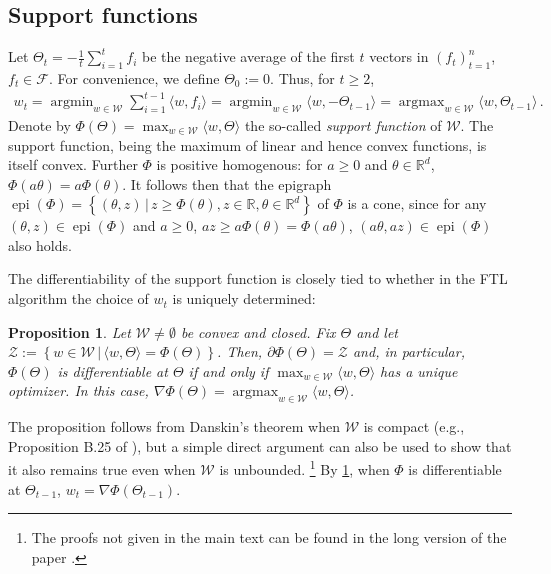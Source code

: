 \documentclass[english]{article}
\newcommand{\todoa}[2][]{\todo[color=Purple!20,size=\tiny,#1]{A: #2}}
\newcommand{\todor}[2][]{\todo[color=Blue!10,size=\tiny,#1]{R: #2}}
\newcommand{\cZ}{\mathcal{Z}}
\newcommand{\cW}{\mathcal{W}}
\newcommand{\cF}{\mathcal{F}}
\newcommand{\R}{\mathbb{R}}
\newcommand{\inpro}[2]{\langle #1, #2\rangle}
\newcommand{\ip}[1]{\langle#1\rangle}
\newcommand{\set}[2]{\left\{#1 \,\vert\, #2 \right\}}
\DeclareMathOperator*{\argmin}{argmin}
\DeclareMathOperator*{\argmax}{argmax}
\DeclareMathOperator{\epi}{epi}
\newtheorem{prop}[thm]{Proposition}
\begin{document}
\subsection{Support functions}
Let $\Theta_t = -\frac1t \sum_{i=1}^t f_i$ be the negative average of the first $t$ vectors
in $(f_t)_{t=1}^n$, $f_t\in \cF$.
For convenience, we define $\Theta_0 := 0$.
Thus, for $t\ge 2$,
\begin{align*}
w_t =  \argmin_{w\in\cW} \sum_{i=1}^{t-1} \ip{ w, f_i } = \argmin_{w\in\cW} \ip{ w, -\Theta_{t-1} }
= \argmax_{w\in \cW} \ip{w,\Theta_{t-1}}\,.
\end{align*}
Denote by $\Phi(\Theta) = \max_{w\in\cW} \langle w, \Theta\rangle$ the so-called \emph{support function} of $\cW$. 
The support function, being the maximum of linear and hence convex functions, is itself convex.
Further $\Phi$ is positive homogenous: for $a\ge 0$ and $\theta\in \R^d$, $\Phi(a \theta) = a\Phi(\theta)$.
It follows then that the epigraph $\epi(\Phi) = \set{ (\theta,z)}{ z\ge \Phi(\theta), z\in \R, \theta\in \R^d }$ of $\Phi$ is a cone,
since for any $(\theta,z)\in \epi(\Phi)$ and $a\ge 0$, 
$az \ge a \Phi(\theta) = \Phi(a\theta)$, $(a\theta,az)\in \epi(\Phi)$ also holds.


The differentiability of the support function is closely tied to whether in the FTL algorithm the choice of $w_t$ is
uniquely determined:
\begin{prop} 
\label{prop:derivativePhi}
Let $\cW\ne \emptyset$ be convex and closed.
Fix $\Theta$ and let $\cZ:= \set{w\in \cW}{\inpro{w}{\Theta} =  \Phi(\Theta) }$.
Then, $\partial \Phi(\Theta) = \cZ$ and, in particular,
$\Phi(\Theta)$ is differentiable at $\Theta$ if and only if 
$\max_{w\in\cW} \inpro{w}{\Theta}$ has a unique optimizer.
In this case, $\nabla \Phi(\Theta) = \argmax_{w\in \cW} \ip{w,\Theta}$.
\end{prop}
The proposition follows from Danskin's theorem when $\cW$ is compact
(e.g., Proposition B.25 of \citealt{bertsekas99nonlinear}), 
but a simple
direct argument can also be used to show that it also remains true even when $\cW$ is unbounded. \todor{Remove the footnote.}
\footnote{
The proofs not given in the main text can be found in the long version of the paper \citep{huang16long}. %
} 
By \cref{prop:derivativePhi},
when $\Phi$ is differentiable at $\Theta_{t-1}$,
$w_t = \nabla \Phi(\Theta_{t-1})$.
\end{document}
